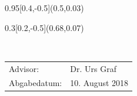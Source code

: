 
\begin{titlepage}
  \setlength{\TPHorizModule}{\paperwidth}
  \setlength{\TPVertModule}{\paperheight}
  
  
  
  \begin{textblock}{0.95}[0.4,-0.5](0.5,0.03)
  \end{textblock}
  \begin{textblock}{0.3}[0.2,-0.5](0.68,0.07)
  \end{textblock}
    \vspace*{8cm}
    \begin{center}
      \Huge{\color{HeadBlue}{Java on the bare ARM metal\\}}
    \vspace*{6cm}
    \normalsize
        {}\\
    \vspace*{1cm}       


    \vspace*{3cm}
    \color{HeadBlue}
    \begin{tabular}{p{4cm}l}
      Advisor: & Dr. Urs Graf \\
      Abgabedatum: & 10. August 2018
    \end{tabular}\\
    \end{center}
  \end{titlepage}





